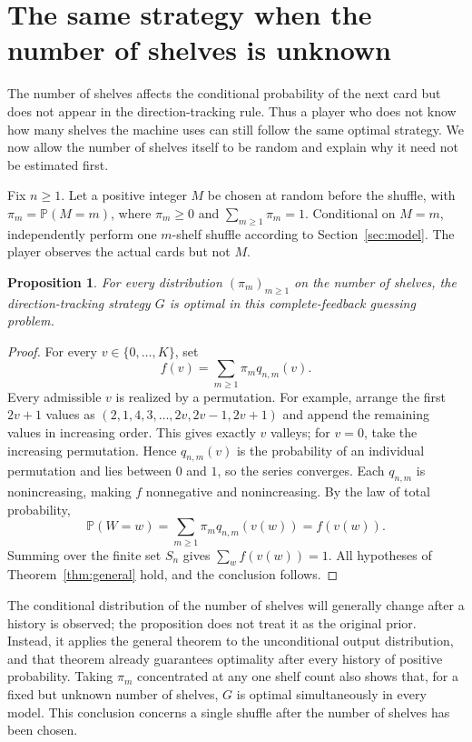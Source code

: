 \documentclass[11pt,reqno]{amsart}
\numberwithin{equation}{section}
\newtheorem{proposition}[theorem]{Proposition}
\theoremstyle{definition}
\theoremstyle{remark}
\begin{document}
\section{The same strategy when the number of shelves is unknown}\label{app:mixture}
The number of shelves affects the conditional probability of the next card but does not appear in the direction-tracking rule. Thus a player who does not know how many shelves the machine uses can still follow the same optimal strategy. We now allow the number of shelves itself to be random and explain why it need not be estimated first.

Fix $n\ge1$. Let a positive integer $M$ be chosen at random before the shuffle, with $\pi_m=\mathbb P(M=m)$, where $\pi_m\ge0$ and $\sum_{m\ge1}\pi_m=1$. Conditional on $M=m$, independently perform one $m$-shelf shuffle according to Section~\ref{sec:model}. The player observes the actual cards but not $M$.

\begin{proposition}\label{prop:unknown-shelves}
For every distribution $(\pi_m)_{m\ge1}$ on the number of shelves, the direction-tracking strategy $G$ is optimal in this complete-feedback guessing problem.
\end{proposition}
\begin{proof}
For every $v\in\{0,\ldots,K\}$, set
\[
 f(v)=\sum_{m\ge1}\pi_m q_{n,m}(v).
\]
Every admissible $v$ is realized by a permutation. For example, arrange the first $2v+1$ values as $(2,1,4,3,\ldots,2v,2v-1,2v+1)$ and append the remaining values in increasing order. This gives exactly $v$ valleys; for $v=0$, take the increasing permutation. Hence $q_{n,m}(v)$ is the probability of an individual permutation and lies between $0$ and $1$, so the series converges. Each $q_{n,m}$ is nonincreasing, making $f$ nonnegative and nonincreasing. By the law of total probability,
\[
 \mathbb P(W=w)=\sum_{m\ge1}\pi_m q_{n,m}(v(w))=f(v(w)).
\]
Summing over the finite set $S_n$ gives $\sum_w f(v(w))=1$. All hypotheses of Theorem~\ref{thm:general} hold, and the conclusion follows.
\end{proof}

The conditional distribution of the number of shelves will generally change after a history is observed; the proposition does not treat it as the original prior. Instead, it applies the general theorem to the unconditional output distribution, and that theorem already guarantees optimality after every history of positive probability. Taking $\pi_m$ concentrated at any one shelf count also shows that, for a fixed but unknown number of shelves, $G$ is optimal simultaneously in every model. This conclusion concerns a single shuffle after the number of shelves has been chosen.
\end{document}
